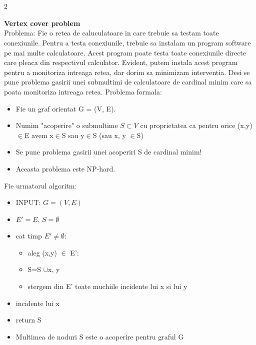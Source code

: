 \documentclass[a4paper]{article}
\begin{document}
\section{}
\begin{multicols}{2}

\textbf{Vertex cover problem}\\
Problema: Fie o retea de caluculatoare in care trebuie sa testam toate conexiunile. Pentru a testa conexiunile, trebuie sa instalam un program software pe mai multe calculatoare. Acest program poate testa toate conexiunile directe care pleaca din respectivul calculator. Evident, putem instala acest program pentru a monitoriza intreaga retea, dar dorim sa minimizam interventia. Desi se pune problema gasirii unei submultimi de calculatoare de cardinal minim care sa poata monitoriza intreaga retea. Problema formala:
\begin{itemize}
    \item Fie un graf orientat G = (V, E).
    \item Numim "acoperire" o submultime $S \subset V$ cu proprietatea ca pentru orice (x,y)$\in$E avem x$\in$S sau y$\in$S (sau x, y $\in$S)
    \item Se pune problema gasirii unei acoperiri S de cardinal minim!
    \item Aceasta problema este NP-hard.
\end{itemize}
Fie urmatorul algoritm:
\begin{itemize}
    \item INPUT: $G=(V, E)$
    \item $E' = E$, $S = \emptyset$
    \item cat timp $E' \neq \emptyset$:
    \begin{itemize}
            \item aleg (x,y) $\in$ E':
            \item S=S $\cup${x, y}
            \item stergem din E' toate muchiile incidente lui x si lui y
            \end{itemize}
    \item incidente lui x
    \item return S
    \item Multimea de noduri S este o acoperire pentru graful G
\end{itemize}


\end{multicols}
\end{document}
